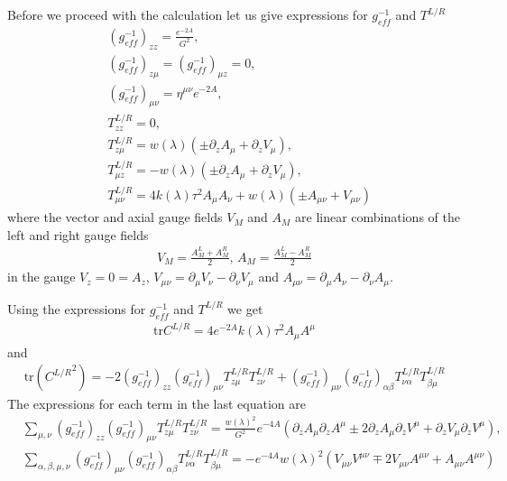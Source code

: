 \documentclass[a4paper,12pt]{article}
\begin{document}
Before we proceed with the calculation let us give expressions for $g^{-1}_{eff}$ and $T^{L/R}$
\begin{align}
&\left(g^{-1}_{eff}\right)_{zz} = \frac{e^{-2A}}{G^2}, \\
&\left(g^{-1}_{eff}\right)_{z\mu} = \left(g^{-1}_{eff}\right)_{\mu z} = 0, \\
&\left(g^{-1}_{eff}\right)_{\mu \nu} = \eta^{\mu \nu} e^{-2A}, \\
& T^{L/R}_{zz} = 0, \\
& T^{L/R}_{z \mu} =  w\left(\lambda \right) \left(  \pm \partial_z A_\mu + \partial_z V_\mu \right), \\
& T^{L/R}_{\mu z} = -  w\left(\lambda \right) \left(  \pm \partial_z A_\mu + \partial_z V_\mu \right), \\
& T^{L/R}_{\mu \nu} = 4 k\left(\lambda\right) \tau^2 A_\mu A_\nu + w\left(\lambda \right) \left( \pm A_{\mu \nu} + V_{\mu \nu} \right)
\end{align}
where the vector and axial gauge fields $V_M$ and $A_M$ are linear combinations of the left and right gauge fields
\begin{align}
V_M = \frac{A^L_M + A^R_M}{2}, \, A_M = \frac{A^L_M - A^R_M}{2}
\end{align}
in the gauge $V_z = 0 = A_z$, $V_{\mu \nu} = \partial_\mu V_\nu  - \partial_\nu V_\mu$ and $A_{\mu \nu} = \partial_\mu A_\nu  - \partial_\nu A_\mu$.

Using the expressions for $g^{-1}_{eff}$ and $T^{L/R}$ we get
\begin{align}
\text{tr} C^{L/R} = 4 e^{-2A} k \left( \lambda \right) \tau^2 A_\mu A^\mu
\end{align}
and
\begin{align}
\text{tr} \left( {C^{L/R}}^2\right) = - 2 \left( g^{-1}_{eff} \right)_{zz} \left( g^{-1}_{eff} \right)_{\mu \nu} T^{L/R}_{z \mu} T^{L/R}_{z \nu} +  \left( g^{-1}_{eff} \right)_{\mu \nu} \left( g^{-1}_{eff} \right)_{\alpha \beta} T^{L/R}_{\nu \alpha} T^{L/R}_{\beta \mu} 
\end{align}
The expressions for each term in the last equation are
\begin{align}
&\sum_{\mu, \nu} \left( g^{-1}_{eff} \right)_{zz} \left( g^{-1}_{eff} \right)_{\mu \nu} T^{L/R}_{z \mu} T^{L/R}_{z \nu} = \frac{{w\left(\lambda\right)}^2}{G^2} e^{-4 A} \left( \partial_z A_\mu \partial_z A^\mu \pm 2 \partial_z A_\mu \partial_z V^\mu + \partial_z V_\mu \partial_z V^\mu \right) , \\
& \sum_{\alpha, \beta, \mu, \nu} \left( g^{-1}_{eff} \right)_{\mu \nu} \left( g^{-1}_{eff} \right)_{\alpha \beta} T^{L/R}_{\nu \alpha} T^{L/R}_{\beta \mu} = - e^{-4A} {w\left(\lambda\right)}^2 \left( V_{\mu \nu} V^{\mu \nu} \mp 2 V_{\mu \nu} A^{\mu \nu} + A_{\mu \nu} A^{\mu \nu} \right)
\end{align}
\end{document}
